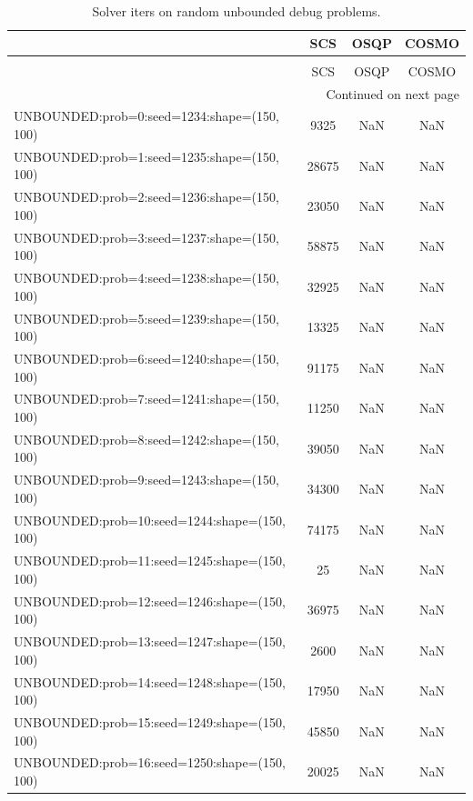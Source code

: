 \begin{longtable}{lccc}
\caption{Solver iters on random unbounded debug problems.}
\label{t-random unbounded debug-iters}\\
\toprule
{} &   SCS &  OSQP &  COSMO \\
\midrule
\endfirsthead
\caption[]{Solver iters on random unbounded debug problems.} \\
\toprule
{} &   SCS &  OSQP &  COSMO \\
\midrule
\endhead
\midrule
\multicolumn{4}{r}{{Continued on next page}} \\
\midrule
\endfoot

\bottomrule
\endlastfoot
UNBOUNDED:prob=0:seed=1234:shape=(150, 100)   &  9325 &   NaN &    NaN \\
UNBOUNDED:prob=1:seed=1235:shape=(150, 100)   & 28675 &   NaN &    NaN \\
UNBOUNDED:prob=2:seed=1236:shape=(150, 100)   & 23050 &   NaN &    NaN \\
UNBOUNDED:prob=3:seed=1237:shape=(150, 100)   & 58875 &   NaN &    NaN \\
UNBOUNDED:prob=4:seed=1238:shape=(150, 100)   & 32925 &   NaN &    NaN \\
UNBOUNDED:prob=5:seed=1239:shape=(150, 100)   & 13325 &   NaN &    NaN \\
UNBOUNDED:prob=6:seed=1240:shape=(150, 100)   & 91175 &   NaN &    NaN \\
UNBOUNDED:prob=7:seed=1241:shape=(150, 100)   & 11250 &   NaN &    NaN \\
UNBOUNDED:prob=8:seed=1242:shape=(150, 100)   & 39050 &   NaN &    NaN \\
UNBOUNDED:prob=9:seed=1243:shape=(150, 100)   & 34300 &   NaN &    NaN \\
UNBOUNDED:prob=10:seed=1244:shape=(150, 100)  & 74175 &   NaN &    NaN \\
UNBOUNDED:prob=11:seed=1245:shape=(150, 100)  &    25 &   NaN &    NaN \\
UNBOUNDED:prob=12:seed=1246:shape=(150, 100)  & 36975 &   NaN &    NaN \\
UNBOUNDED:prob=13:seed=1247:shape=(150, 100)  &  2600 &   NaN &    NaN \\
UNBOUNDED:prob=14:seed=1248:shape=(150, 100)  & 17950 &   NaN &    NaN \\
UNBOUNDED:prob=15:seed=1249:shape=(150, 100)  & 45850 &   NaN &    NaN \\
UNBOUNDED:prob=16:seed=1250:shape=(150, 100)  & 20025 &   NaN &    NaN \\

\end{longtable}
